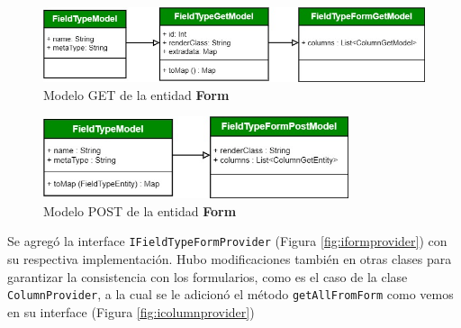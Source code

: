 \documentclass{article}
\begin{document}
\begin{figure}[H]
  \centering
  \includegraphics[width=1.0\textwidth]{images/form_get_model.jpg}
  \caption{Modelo GET de la entidad \textbf{Form}}
  \label{fig:formgetmodel}
\end{figure}
\begin{figure}[H]
    \centering
    \includegraphics[width=0.8\textwidth]{images/form_post_model.jpg}
    \caption{Modelo POST de la entidad \textbf{Form}}
    \label{fig:formpostmodel}
\end{figure}

Se agregó la interface \texttt{IFieldTypeFormProvider} (Figura \ref{fig:iformprovider}) con su respectiva implementación. Hubo modificaciones también en otras clases para garantizar la consistencia con los formularios, como es el caso de la clase \texttt{ColumnProvider}, a la cual se le adicionó el método \texttt{getAllFromForm} como vemos en su interface (Figura \ref{fig:icolumnprovider})
\end{document}
